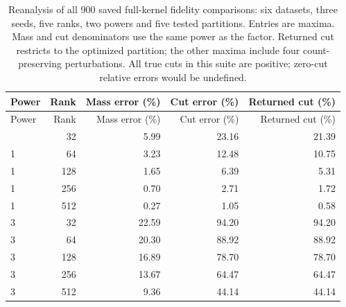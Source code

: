 \begin{longtable}{lrrrr}
\caption{Reanalysis of all 900 saved full-kernel fidelity comparisons: six datasets, three seeds, five ranks, two powers and five tested partitions. Entries are maxima. Mass and cut denominators use the same power as the factor. Returned cut restricts to the optimized partition; the other maxima include four count-preserving perturbations. All true cuts in this suite are positive; zero-cut relative errors would be undefined.}\\
\toprule
Power & Rank & Mass error (\%) & Cut error (\%) & Returned cut (\%)\\\midrule
\endfirsthead
\toprule
Power & Rank & Mass error (\%) & Cut error (\%) & Returned cut (\%)\\\midrule
\endhead
\midrule\endfoot
\bottomrule\endlastfoot
1 & 32 & 5.99 & 23.16 & 21.39\\
1 & 64 & 3.23 & 12.48 & 10.75\\
1 & 128 & 1.65 & 6.39 & 5.31\\
1 & 256 & 0.70 & 2.71 & 1.72\\
1 & 512 & 0.27 & 1.05 & 0.58\\
3 & 32 & 22.59 & 94.20 & 94.20\\
3 & 64 & 20.30 & 88.92 & 88.92\\
3 & 128 & 16.89 & 78.70 & 78.70\\
3 & 256 & 13.67 & 64.47 & 64.47\\
3 & 512 & 9.36 & 44.14 & 44.14\\
\end{longtable}

